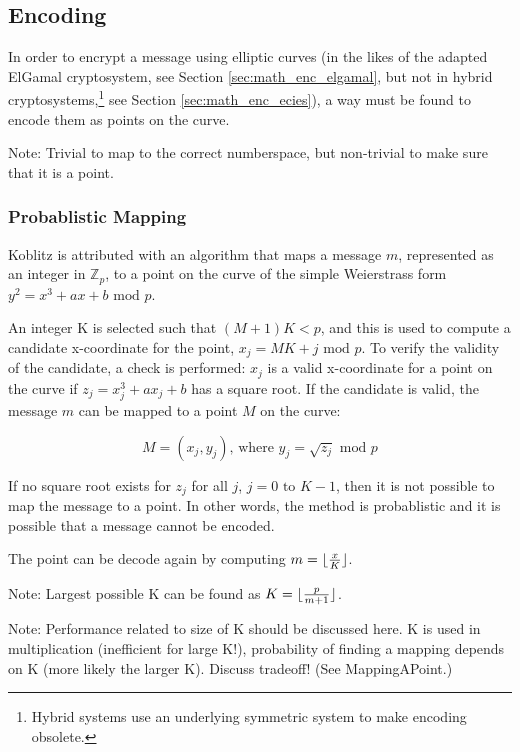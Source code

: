\subsection{Encoding}
\label{sec:math_encoding}

In order to encrypt a message using elliptic curves (in the likes of the adapted ElGamal cryptosystem, see Section \ref{sec:math_enc_elgamal},
but not in hybrid cryptosystems,\footnote{Hybrid systems use an underlying symmetric system to make encoding obsolete.} see Section
\ref{sec:math_enc_ecies}), a way must be found to encode them as points on the curve.

Note: Trivial to map to the correct numberspace, but non-trivial to make sure that it is a point.

\subsubsection{Probablistic Mapping}

Koblitz is attributed with an algorithm that maps a message \(m\), represented as an integer in \(\mathbb{Z}_p\), to a point on the curve of the
simple Weierstrass form \(y^2 = x^3 + ax + b \text{ mod } p\).

An integer K is selected such that \((M + 1)K < p\), and this is used to compute
a candidate x-coordinate for the point, \(x_j = MK + j \text{ mod } p\). To verify the validity of the candidate, a check is performed: \(x_j\)
is a valid x-coordinate for a point on the curve if \(z_j = x_j^3 + ax_j + b\) has a square root. If the candidate is valid, the message \(m\)
can be mapped to a point \(M\) on the curve:

\begin{equation}
	M = (x_j, y_j) \text{, where } y_j = \sqrt{z_j} \text{ mod } p
\end{equation}

If no square root exists for \(z_j\) for all \(j\), \(j = 0 \text{ to } K-1\), then it is not possible to map the message to a point. In other
words, the method is probablistic and it is possible that a message cannot be encoded.\cite{MappingAMessage}

The point can be decode again by computing \(m = {\lfloor {{x} \over {K}} \rfloor}\).

Note: Largest possible K can be found as \(K = \lfloor {{p} \over {m + 1}} \rfloor\).

Note: Performance related to size of K should be discussed here. K is used in multiplication (inefficient for large K!), probability of finding
a mapping depends on K (more likely the larger K). Discuss tradeoff! (See MappingAPoint.)


